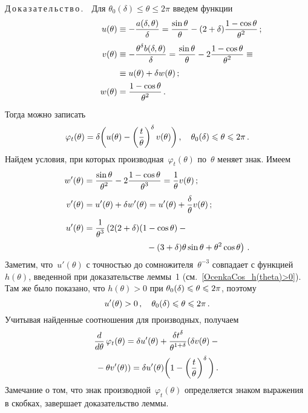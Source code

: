 \begin{multicols}{2}
Д\,о\,к\,а\,з\,а\,т\,е\,л\,ь\,с\,т\,в\,о\,.\  \
Для $\theta_0(\delta)\le\theta\le2\pi$ введем функции
\begin{align*}
u(\theta)&\equiv -\fr{a(\d,\theta)}{\d}= \fr{\sin\theta}{\theta}-
(2+\d)\fr{1-\cos\theta}{\theta^2}\,;\\
v(\theta)&\equiv -\fr{\theta^{\d}b(\d,\theta)}{\d}=
\fr{\sin\theta}{\theta}-2\fr{1-\cos\theta}{\theta^2}\equiv{}\\
& \equiv u(\theta)+\d w(\theta)\,;\\
\ \ \ \ \ \ \ \ \ \ \ \ \ \ \ \ \ w(\theta)&=\fr{1-\cos\theta}{\theta^2}\,.
\end{align*}
Тогда можно записать
\begin{equation*}
\varphi_{t}(\theta)=
\delta\bigg(u(\theta)-\left(\displaystyle\frac{\displaystyle t\mathstrut}{\displaystyle \theta\mathstrut}\right)^{\delta}v(\theta)\bigg)\,,\quad
\theta_0(\delta)\leqslant\theta\leqslant2\pi\,.
\end{equation*}
Найдем условия, при которых производная~$\varphi_{t}(\theta)$ по~$\theta$ меняет знак. Имеем
\begin{align*}
w^\prime(\theta)&=
\fr{\sin\theta}{\theta^2}-2\fr{1-\cos\theta}{\theta^3}=
\fr{1}{\theta}v(\theta)\,;\\
v^\prime(\theta)&= u^\prime(\theta)+\d w^\prime(\theta)=u^\prime(\theta)+\fr{\d}{\theta}v(\theta)\,;\\
u^\prime(\theta)&= \fr{1}{\theta^3}\left(2(2+\d)(1-\cos\theta)-{}\right.\\
&\hspace*{25mm}\left.{}-
(3+\d)\theta\sin\theta+\theta^2\cos\theta\right)\,.
\end{align*}
Заметим, что~$u'(\theta)$ с точностью до сомножителя~$\theta^{-3}$
совпадает с функцией~$h(\theta)$, введенной при доказательстве
леммы~1 (см.~\eqref{OcenkaCos_h(theta)>0}). Там же
было показано, что ${h(\theta)>0}$ при
${\theta_0(\delta)\leqslant\theta\leqslant2\pi}$, поэтому
$$
u^\prime(\theta)>0\,,\quad\theta_0(\delta)\leqslant\theta\leqslant2\pi\,.
$$
Учитывая найденные соотношения для производных, получаем
\begin{multline*}
\displaystyle\frac{\displaystyle d\mathstrut}{\displaystyle d\theta\mathstrut}\,\varphi_{t}(\theta)= \delta u^\prime(\theta)+\displaystyle\frac{\displaystyle \delta
t^{\delta}\mathstrut}{\displaystyle \theta^{1+\delta}\mathstrut}(\delta v(\theta)-{}\\
{}-
\theta v'(\theta))= \delta
u^\prime(\theta)\bigg(1-\left(\displaystyle\frac{\displaystyle t\mathstrut}{\displaystyle \theta\mathstrut}\right)^{\delta}\bigg)\,.
\end{multline*}
Замечание о том, что знак производной~$\varphi_{t}(\theta)$
определяется знаком выражения в скобках, завершает доказательство
леммы.

\medskip


\end{multicols}

